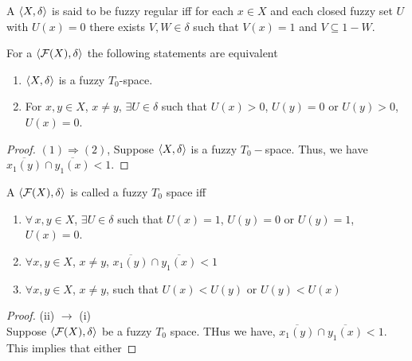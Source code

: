 \documentclass[../main-sheet.tex]{subfiles}
\begin{document}
\begin{defn}
    A \fts \s \(\langle X, \delta \rangle \) is said to be fuzzy regular iff for each \(x\in X \) and each closed  fuzzy set \(U \) with \(U(x)=0\) there exists \(V,W\in\delta\) such that \(V(x)=1\) and \(V\subseteq 1-W \).
\end{defn}
\begin{thm}
    For a \fts \(\langle \mathcal{F}(X), \delta \rangle\) the following statements are equivalent
    \begin{enumerate}
        \item \(\langle X, \delta \rangle\) is a fuzzy \(T_0 \)-space.
        \item For \(x,y\in X \), \(x\neq y \), \(\exists U\in \delta\) such that \(U(x)>0\), \(U(y)=0\) or \(U(y)>0\), \(U(x)=0\).
    \end{enumerate}
\end{thm}
\begin{proof}
    \((1)\Rightarrow(2)\), Suppose \(\langle X, \delta \rangle \) is a fuzzy \(T_0-\)space. Thus, we have \(\overline{x_1(y )}\cap \overline{y_1(x )}<1\).
\end{proof}
\begin{thm}
    A \fts\s \(\langle \mathcal{F}(X), \delta \rangle\) is called a fuzzy \(T_0\) space iff
    \begin{enumerate}[label=(\roman*)]
        \item \(\forall\,x,y\in X \), \(\exists U\in \delta\) such that \(U(x)=1\), \(U(y)=0\) or \(U(y )=1\), \(U(x)=0\).
        \item \(\forall x,y \in X \), \(x\neq y \), \(\overline{x_1(y)}\cap \overline{y_1(x)}<1\)
        \item \(\forall x,y \in X \), \(x\neq y \), such that \(U(x)<U(y)\) or \(U(y)<U(x)\)
    \end{enumerate}
\end{thm}
\begin{proof}
    (ii) \(\to \) (i)\\
    Suppose \(\langle \mathcal{F}(X), \delta \rangle \) be a fuzzy \(T_0\) space. THus we have, \(\overline{x_1(y)}\cap \overline{y_1(x)}<1\). This implies that either 
\end{proof}
\end{document}
